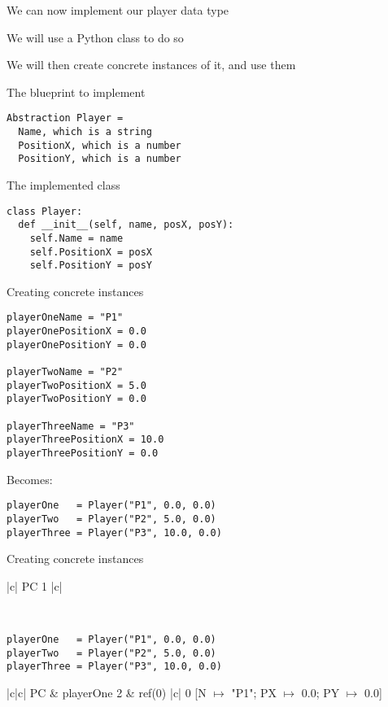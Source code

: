 \documentclass{beamer}
\begin{document}
\begin{slide}{
\item We can now implement our player data type
\item We will use a Python class to do so
\item We will then create concrete instances of it, and use them
}\end{slide}

\begin{frame}[fragile]{The blueprint to implement}
\begin{lstlisting}
Abstraction Player =
  Name, which is a string
  PositionX, which is a number
  PositionY, which is a number
\end{lstlisting}
\end{frame}

\begin{frame}[fragile]{The implemented class}
\begin{lstlisting}
class Player:
  def __init__(self, name, posX, posY):
    self.Name = name
    self.PositionX = posX
    self.PositionY = posY
\end{lstlisting}
\end{frame}

\begin{frame}[fragile]{Creating concrete instances}
\begin{lstlisting}
playerOneName = "P1"
playerOnePositionX = 0.0
playerOnePositionY = 0.0

playerTwoName = "P2"
playerTwoPositionX = 5.0
playerTwoPositionY = 0.0

playerThreeName = "P3"
playerThreePositionX = 10.0
playerThreePositionY = 0.0
\end{lstlisting}

Becomes:

\begin{lstlisting}
playerOne   = Player("P1", 0.0, 0.0)
playerTwo   = Player("P2", 5.0, 0.0)
playerThree = Player("P3", 10.0, 0.0)
\end{lstlisting}
\end{frame}



\begin{frame}[fragile]{Creating concrete instances}
\begin{memorytable}
{|c|}
{PC}
{1}
{|c|}
{}
{}
\end{memorytable}

\ \\

\begin{lstlisting}
playerOne   = Player("P1", 0.0, 0.0)
playerTwo   = Player("P2", 5.0, 0.0)
playerThree = Player("P3", 10.0, 0.0)
\end{lstlisting}

\pause

\begin{memorytable}
{|c|c|}
{PC & playerOne}
{2 & ref(0)}
{|c|}
{0}
{[N $\mapsto$ "P1"; PX $\mapsto$ 0.0; PY $\mapsto$ 0.0]}
\end{memorytable}
\end{frame}
\end{document}
